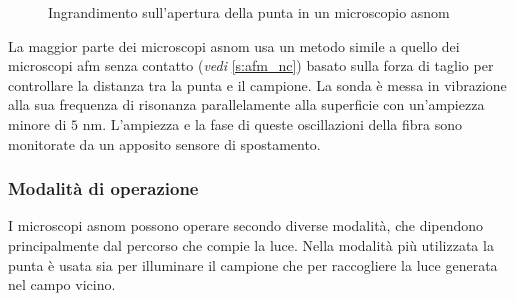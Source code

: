 \documentclass[../main.tex]{subfiles}
\begin{document}
\begin{figure}[h]
\begin{subfigure}{0.35\linewidth}
\end{subfigure}
\begin{subfigure}{0.3 \linewidth}
	\centering
\end{subfigure}
\begin{subfigure}{0.3 \linewidth}
	\centering
\end{subfigure}
\caption[Ingrandimento sull'apertura della punta in un microscopio a-SNOM]{
	Ingrandimento sull'apertura della punta in un microscopio \acrshort{asnom}}
\label{fig:snom_probe}
\end{figure}

La maggior parte dei microscopi \acrshort{asnom} usa un metodo simile a quello dei microscopi \acrshort{afm} senza contatto (\textit{vedi} \ref{s:afm_nc}) basato sulla forza di taglio per controllare la distanza tra la punta e il campione. La sonda è messa in vibrazione alla sua frequenza di risonanza parallelamente alla superficie con un'ampiezza minore di $5$ nm. L'ampiezza e la fase di queste oscillazioni della fibra sono monitorate da un apposito sensore di spostamento.\cite{hecht_2000}

\subsubsection{Modalità di operazione}

I microscopi \acrshort{asnom} possono operare secondo diverse modalità, che dipendono principalmente dal percorso che compie la luce. Nella modalità più utilizzata la punta è usata sia per illuminare il campione che per raccogliere la luce generata nel campo vicino.\cite{alvarez_2006}\\
\end{document}
